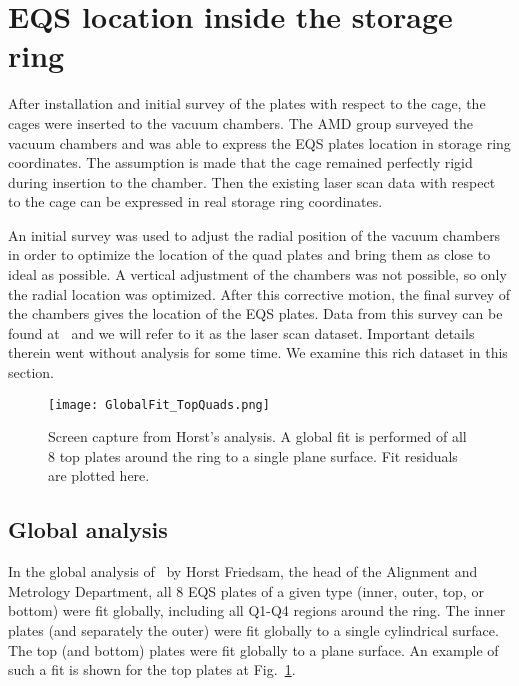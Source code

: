 \section{\label{sec:EQS_location_FromLaserScan} EQS location inside the storage ring}
\medskip

After installation and initial survey of the plates with respect to the cage, the cages were inserted to the vacuum chambers. 
The AMD group surveyed the vacuum chambers and was able to express the EQS plates location in storage ring coordinates. The assumption is made that the cage remained perfectly rigid during insertion to the chamber. Then the existing laser scan data with respect to the cage can be expressed in real storage ring coordinates. 

An initial survey was used to adjust the radial position of the vacuum chambers in order to optimize the location of the quad plates and bring them as close to ideal as possible. A vertical adjustment of the chambers was not possible, so only the radial location was optimized.
After this corrective motion, the final survey of the chambers gives the location of the EQS plates. 
Data from this survey can be found at~\cite{Horst:doc5955} and we will refer to it as the laser scan dataset. 
Important details therein went without analysis for some time.
We examine this rich dataset in this section.

\begin{figure}[]
	\centering
	\texttt{[image: GlobalFit\_TopQuads.png]}
	\caption{Screen capture from Horst's analysis. A global fit is performed of all 8 top plates around the ring to a single plane surface. Fit residuals are plotted here.}\label{fig:GlobalFit_TopQuads}
\end{figure}



\subsection{\label{sec:LaserScanGlobalAnalysis} Global analysis}


In the global analysis of~\cite{Horst:doc5955} by Horst Friedsam, the head of the Alignment and Metrology Department, all 8 EQS plates of a given type (inner, outer, top, or bottom) were fit globally, including all Q1-Q4 regions around the ring. 
The inner plates (and separately the outer) were fit globally to a single cylindrical surface. The top (and bottom) plates were fit globally to a plane surface.
An example of such a fit is shown for the top plates at Fig.~\ref{fig:GlobalFit_TopQuads}.





